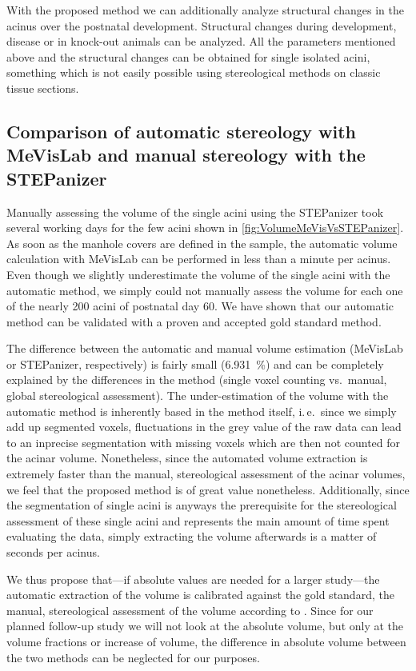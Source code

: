 \documentclass[%
	twoside,
	paper=a4,%
	abstract=true,%
	]{scrartcl}
\newcommand{\ie}{i.\,e.\ }
\newcommand{\difference}{6.931}
\begin{document}
With the proposed method we can additionally analyze structural changes in the acinus over the postnatal development. Structural changes during development, disease or in knock-out animals can be analyzed. All the parameters mentioned above and the structural changes can be obtained for single isolated acini, something which is not easily possible using stereological methods on classic tissue sections.

\subsection[Comparison of MeVisLab with STEPanizer]{Comparison of automatic stereology with MeVisLab and manual stereology with the STEPanizer}
Manually assessing the volume of the single acini using the STEPanizer took several working days for the few acini shown in \autoref{fig:VolumeMeVisVsSTEPanizer}. As soon as the manhole covers are defined in the sample, the automatic volume calculation with MeVisLab can be performed in less than a minute per acinus. Even though we slightly underestimate the volume of the single acini with the automatic method, we simply could not manually assess the volume for each one of the nearly 200 acini of postnatal day 60. We have shown that our automatic method can be validated with a proven and accepted gold standard method.

The difference between the automatic and manual volume estimation (MeVisLab or STEPanizer, respectively) is fairly small (\SI{\difference}{\percent}) and can be completely explained by the differences in the method (single voxel counting vs.\ manual, global stereological assessment). The under-estimation of the volume with the automatic method is inherently based in the method itself, \ie since we simply add up segmented voxels, fluctuations in the grey value of the raw data can lead to an inprecise segmentation with missing voxels which are then not counted for the acinar volume. Nonetheless, since the automated volume extraction is extremely faster than the manual, stereological assessment of the acinar volumes, we feel that the proposed method is of great value nonetheless. Additionally, since the segmentation of single acini is anyways the prerequisite for the stereological assessment of these single acini and represents the main amount of time spent evaluating the data, simply extracting the volume afterwards is a matter of seconds per acinus.

We thus propose that---if absolute values are needed for a larger study---the automatic extraction of the volume is calibrated against the gold standard, the manual, stereological assessment of the volume according to \citet{Hsia2010}. Since for our planned follow-up study we will not look at the absolute volume, but only at the volume fractions or increase of volume, the difference in absolute volume between the two methods can be neglected for our purposes.
\end{document}

